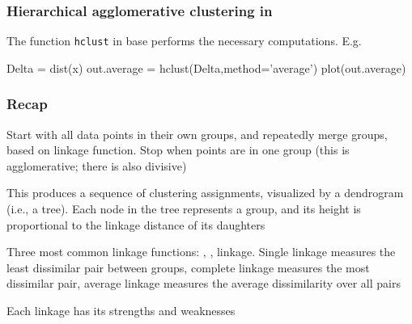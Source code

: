 \documentclass{beamer}
\begin{document}
\begin{frame}[fragile]
\frametitle{Hierarchical agglomerative clustering in }
The function {\tt hclust} in base  performs the necessary computations.  E.g.
\begin{blockcode}
Delta = dist(x)
out.average = hclust(Delta,method='average')
plot(out.average)
\end{blockcode}
\end{frame}

\begin{frame}
\frametitle{Recap}
 Start with all data points in
their own groups, and repeatedly merge groups, based on linkage
function. Stop when points are in one group (this is agglomerative;
there is also divisive)
\vsp

This produces a sequence of clustering assignments, visualized by a
dendrogram (i.e., a tree). Each node in the tree represents a group,
and its height is proportional to the linkage distance of its daughters

\vsp
Three most common linkage functions: , , 
linkage. Single linkage measures the least dissimilar pair between
groups, complete linkage measures the most dissimilar pair,
average linkage measures the average dissimilarity over all pairs
\vsp

Each linkage has its strengths and weaknesses
\end{frame}
\end{document}
